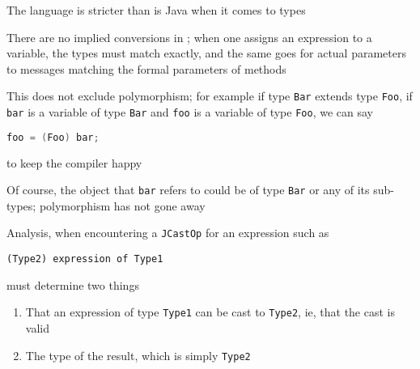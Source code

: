 \documentclass[8pt,a4paper,compress]{beamer}
\begin{document}
\begin{frame}[fragile]
\pause

The \jmm language is stricter than is Java when it comes to types

\pause
\bigskip

There are no implied conversions in \jmm; when one assigns an expression to a variable, the types must match exactly, and the same goes for actual parameters to messages matching the formal parameters of methods

\pause
\bigskip

This does not exclude polymorphism; for example if type \lstinline{Bar} extends type \lstinline{Foo}, if \lstinline{bar} is a variable of type \lstinline{Bar} and \lstinline{foo} is a variable of type \lstinline{Foo}, we can say
\begin{lstlisting}[language=Java,style=focusin]
foo = (Foo) bar;
\end{lstlisting}
to keep the \jmm compiler happy

\pause
\bigskip

Of course, the object that \lstinline{bar} refers to could be of type \lstinline{Bar} or any of its sub-types; polymorphism has not gone away

\pause
\bigskip

Analysis, when encountering a \lstinline{JCastOp} for an expression such as 
\begin{lstlisting}[language={},style=focusin]
    (Type2) expression of Type1
\end{lstlisting}
must determine two things
\begin{enumerate}
\pause
\item That an expression of type \lstinline{Type1} can be cast to \lstinline{Type2}, ie, that the cast is valid
\pause
\item The type of the result, which is simply \lstinline{Type2}
\end{enumerate}
\end{frame}
\end{document}
